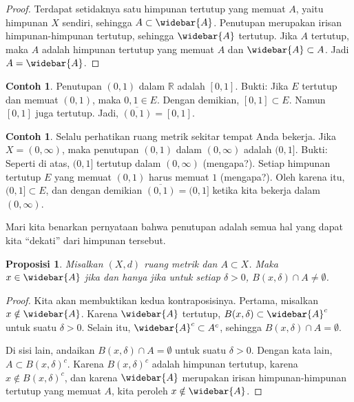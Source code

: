 \documentclass[12pt,openany]{book}
\newcommand{\R}{{\mathbb{R}}}
\newcommand{\myquote}[1]{``#1''}
\theoremstyle{plain}
\newtheorem{prop}[thm]{Proposisi}
\theoremstyle{remark}
\theoremstyle{definition}
\theoremstyle{exercise}
\theoremstyle{example}
\newtheorem{example}[thm]{Contoh}
\begin{document}
\begin{proof}
Terdapat setidaknya satu himpunan tertutup yang memuat $A$, yaitu himpunan $X$ sendiri,
sehingga $A \subset \widebar{A}$.
Penutupan merupakan irisan himpunan-himpunan tertutup, sehingga $\widebar{A}$ tertutup.
Jika $A$ tertutup, maka $A$ adalah himpunan tertutup yang memuat $A$
dan $\widebar{A} \subset A$. Jadi $A = \widebar{A}$.
\end{proof}

\begin{example}
Penutupan $(0,1)$ dalam $\R$ adalah $[0,1]$. Bukti: Jika
$E$ tertutup dan memuat $(0,1)$, maka $0,1 \in E$.
Dengan demikian, $[0,1] \subset E$. Namun $[0,1]$ juga tertutup.
Jadi, $\overline{(0,1)} = [0,1]$.
\end{example}

\begin{example}
Selalu perhatikan ruang metrik sekitar tempat Anda bekerja.
Jika $X = (0,\infty)$, maka
penutupan $(0,1)$ dalam $(0,\infty)$ adalah $(0,1]$. Bukti: Seperti
di atas, $(0,1]$ tertutup dalam $(0,\infty)$ (mengapa?). Setiap himpunan tertutup $E$
yang memuat $(0,1)$ harus memuat $1$ (mengapa?). Oleh karena itu, $(0,1] \subset E$,
dan dengan demikian $\overline{(0,1)} = (0,1]$ ketika kita bekerja dalam $(0,\infty)$.
\end{example}

Mari kita benarkan pernyataan bahwa penutupan adalah semua hal yang dapat kita
\myquote{dekati} dari himpunan tersebut.

\begin{prop} \label{prop:msclosureappr}
Misalkan $(X,d)$ ruang metrik dan $A \subset X$. Maka $x \in \widebar{A}$
jika dan hanya jika untuk setiap $\delta > 0$, $B(x,\delta) \cap A \neq \emptyset$.
\end{prop}

\begin{proof}
Kita akan membuktikan kedua kontraposisinya.
Pertama, misalkan $x \notin \widebar{A}$. Karena $\widebar{A}$
tertutup,
$B(x,\delta) \subset \widebar{A}^c$
untuk suatu $\delta > 0$.
Selain itu, $\widebar{A}^c \subset A^c$, sehingga
$B(x,\delta) \cap A = \emptyset$.

Di sisi lain, andaikan
$B(x,\delta) \cap A = \emptyset$ untuk suatu $\delta > 0$.
Dengan kata lain,
$A \subset {B(x,\delta)}^c$.
Karena
${B(x,\delta)}^c$ adalah himpunan tertutup, karena $x \not \in {B(x,\delta)}^c$,
dan karena $\widebar{A}$ merupakan irisan
himpunan-himpunan tertutup yang memuat $A$, kita peroleh $x \notin \widebar{A}$.
\end{proof}
\end{document}
